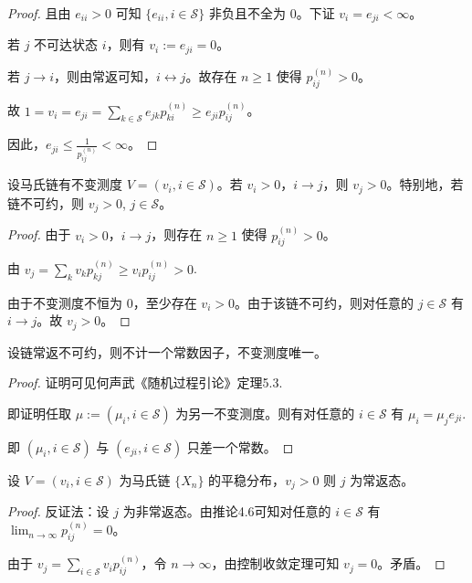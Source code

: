 \documentclass[lang=cn,10pt,thmcnt=section]{elegantbook}
\begin{document}
\begin{proof}
		且由 $e_{ii} > 0$ 可知 $\{e_{ii}, i \in \mathcal{S}\}$ 非负且不全为 0。下证 $v_i = e_{ji} < \infty$。
		
		若 $j$ 不可达状态 $i$，则有 $v_i := e_{ji} = 0$。
		
		若 $j \rightarrow i$，则由常返可知，$i \leftrightarrow j$。故存在 $n \geq 1$ 使得 $p_{ij}^{(n)} > 0$。
		
		故 $1 = v_i = e_{ji} = \sum_{k \in \mathcal{S}} e_{jk} p_{ki}^{(n)} \geq e_{ji} p_{ij}^{(n)}$。
		
		因此，$e_{ji} \leq \frac{1}{p_{ij}^{(n)}} < \infty$。
		
\end{proof}
\begin{lemma}
	设马氏链有不变测度 $V = (v_i, i \in \mathcal{S})$。若 $v_i > 0$，$i \rightarrow j$，则 $v_j > 0$。特别地，若链不可约，则 $v_j > 0$, $j \in \mathcal{S}$。

\end{lemma}
\begin{proof}
	由于 $v_i > 0$，$i \rightarrow j$，则存在 $n \geq 1$ 使得 $p_{ij}^{(n)} > 0$。

由 $v_j = \sum_k v_k p_{kj}^{(n)} \geq v_i p_{ij}^{(n)} > 0$.

由于不变测度不恒为 0，至少存在 $v_i > 0$。由于该链不可约，则对任意的 $j \in \mathcal{S}$ 有 $i \rightarrow j$。故 $v_j > 0$。

\end{proof}
\begin{lemma}
	设链常返不可约，则不计一个常数因子，不变测度唯一。
\end{lemma}
\begin{proof}

	证明可见何声武《随机过程引论》定理5.3.

	即证明任取 $\mu := (\mu_i, i \in \mathcal{S})$ 为另一不变测度。则有对任意的 $i \in \mathcal{S}$ 有 $\mu_i = \mu_j e_{ji}$.

即 $(\mu_i, i \in \mathcal{S})$ 与 $(e_{ji}, i \in \mathcal{S})$ 只差一个常数。
\end{proof}
\begin{lemma}
	设 $V = (v_i, i \in \mathcal{S})$ 为马氏链 $\{X_n\}$ 的平稳分布，$v_j > 0$ 则 $j$ 为常返态。
\end{lemma}
\begin{proof}
	反证法：设 $j$ 为非常返态。由推论4.6可知对任意的 $i \in \mathcal{S}$ 有 $\lim_{n \to \infty} p_{ij}^{(n)} = 0$。

由于 $v_j = \sum_{i \in \mathcal{S}} v_i p_{ij}^{(n)}$，令 $n \to \infty$，由控制收敛定理可知 $v_j = 0$。矛盾。
\end{proof}
\end{document}
